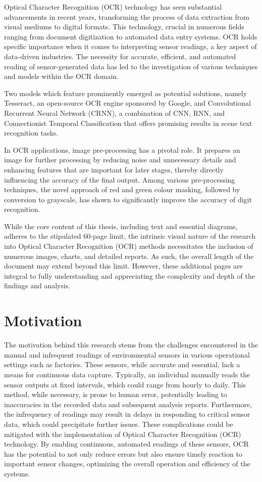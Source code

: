 Optical Character Recognition (OCR) technology has seen substantial advancements in recent years, transforming the process of data extraction from visual mediums to digital formats. This technology, crucial in numerous fields ranging from document digitization to automated data entry systems. OCR holds specific importance when it comes to interpreting sensor readings, a key aspect of data-driven industries. The necessity for accurate, efficient, and automated reading of sensor-generated data has led to the investigation of various techniques and models within the OCR domain.

Two models which feature prominently emerged as potential solutions, namely Tesseract, an open-source OCR engine sponsored by Google, and Convolutional Recurrent Neural Network (CRNN), a combination of CNN, RNN, and Connectionist Temporal Classification that offers promising results in scene text recognition tasks.

In OCR applications, image pre-processing has a pivotal role. It prepares an image for further processing by reducing noise and unnecessary details and enhancing features that are important for later stages, thereby directly influencing the accuracy of the final output. Among various pre-processing techniques, the novel approach of red and green colour masking, followed by conversion to grayscale, has shown to significantly improve the accuracy of digit recognition.

While the core content of this thesis, including text and essential diagrams, adheres to the stipulated 60-page limit, the intrinsic visual nature of the research into Optical Character Recognition (OCR) methods necessitates the inclusion of numerous images, charts, and detailed reports. As such, the overall length of the document may extend beyond this limit. However, these additional pages are integral to fully understanding and appreciating the complexity and depth of the findings and analysis.


\section{Motivation}


The motivation behind this research stems from the challenges encountered in the manual and infrequent readings of environmental sensors in various operational settings such as factories. These sensors, while accurate and essential, lack a means for continuous data capture. Typically, an individual manually reads the sensor outputs at fixed intervals, which could range from hourly to daily. This method, while necessary, is prone to human error, potentially leading to inaccuracies in the recorded data and subsequent analysis reports. Furthermore, the infrequency of readings may result in delays in responding to critical sensor data, which could precipitate further issues. These complications could be mitigated with the implementation of Optical Character Recognition (OCR) technology. By enabling continuous, automated readings of these sensors, OCR has the potential to not only reduce errors but also ensure timely reaction to important sensor changes, optimizing the overall operation and efficiency of the systems.

